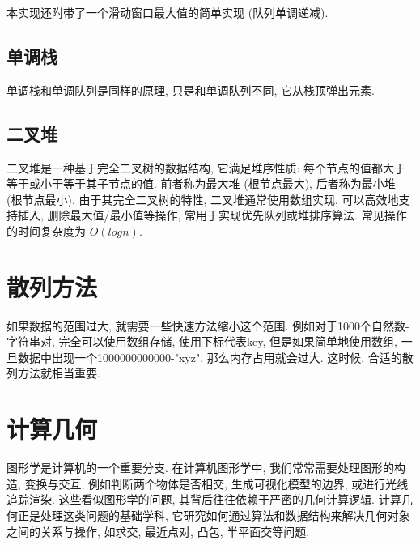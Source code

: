 \documentclass[a4paper]{ctexbook}
\begin{document}
本实现还附带了一个滑动窗口最大值的简单实现 (队列单调递减).



\section{单调栈}

单调栈和单调队列是同样的原理, 只是和单调队列不同, 它从栈顶弹出元素.



\section{二叉堆}

二叉堆是一种基于完全二叉树的数据结构, 它满足堆序性质: 每个节点的值都大于等于或小于等于其子节点的值. 前者称为最大堆 (根节点最大), 后者称为最小堆 (根节点最小). 由于其完全二叉树的特性, 二叉堆通常使用数组实现, 可以高效地支持插入, 删除最大值/最小值等操作, 常用于实现优先队列或堆排序算法. 常见操作的时间复杂度为 $O(log n)$.



\chapter{散列方法}

如果数据的范围过大, 就需要一些快速方法缩小这个范围. 例如对于1000个自然数-字符串对, 完全可以使用数组存储, 使用下标代表key, 但是如果简单地使用数组, 一旦数据中出现一个1000000000000-"xyz", 那么内存占用就会过大. 这时候, 合适的散列方法就相当重要.



\chapter{计算几何}

图形学是计算机的一个重要分支. 在计算机图形学中, 我们常常需要处理图形的构造, 变换与交互, 例如判断两个物体是否相交, 生成可视化模型的边界, 或进行光线追踪渲染. 这些看似图形学的问题, 其背后往往依赖于严密的几何计算逻辑. 计算几何正是处理这类问题的基础学科, 它研究如何通过算法和数据结构来解决几何对象之间的关系与操作, 如求交, 最近点对, 凸包, 半平面交等问题.
\end{document}
